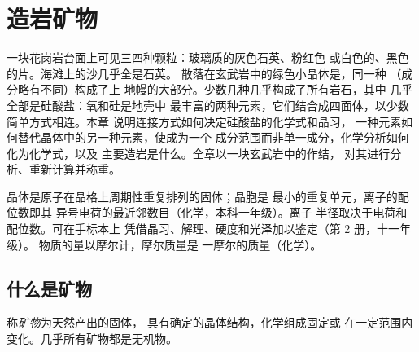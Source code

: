 \chapter{造岩矿物}\label{ch:b1:rock-forming-minerals}

一块花岗岩台面上可见三四种颗粒：玻璃质的灰色石英、粉红色
或白色的、黑色的片。海滩上的沙几乎全是石英。
散落在玄武岩中的绿色小晶体是，同一种
（成分略有不同）构成了上
地幔的大部分。少数几种几乎构成了所有岩石，其中
几乎全部是硅酸盐：氧和硅是地壳中
最丰富的两种元素，它们结合成四面体，以少数简单方式相连。本章
说明连接方式如何决定硅酸盐的化学式和晶习，
一种元素如何替代晶体中的另一种元素，使成为一个
成分范围而非单一成分，化学分析如何化为化学式，以及
主要造岩是什么。全章以一块玄武岩中的作结，
对其进行分析、重新计算并称重。

\begin{recall}
晶体是原子在晶格上周期性重复排列的固体；晶胞是
最小的重复单元，离子的配位数即其
异号电荷的最近邻数目（化学，本科一年级）。离子
半径取决于电荷和配位数。可在手标本上
凭借晶习、解理、硬度和光泽加以鉴定（第 2 册，十一年级）。
物质的量以摩尔计，摩尔质量是
一摩尔的质量（化学）。
\end{recall}

\section{什么是矿物}

\begin{definition}[矿物]\label{def:b1:rock-forming-minerals:mineral}
称\emph{矿物}为天然产出的固体，
具有确定的晶体结构，化学组成固定或
在一定范围内变化。几乎所有矿物都是无机物。
\end{definition}

